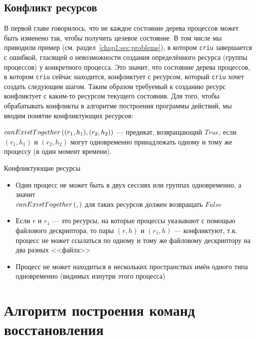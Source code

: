 \subsection{Конфликт ресурсов}
\label{chap2:subsec:conflict}

В первой главе говорилось, что не каждое состояние дерева процессов может быть изменено так, чтобы получить целевое 
состояние. В том числе мы приводили пример (см. раздел~\ref{chap1:sec:problems}), в котором \texttt{criu} завершается 
с ошибкой, гласящей о невозможности создания определённого ресурса (группы процессов) у конкретного процесса. Это 
значит, что состояние дерева процессов, в котором \texttt{criu} сейчас находится, конфликтует с ресурсом, который 
\texttt{criu} хочет создать следующим шагом. Таким образом требуемый к созданию ресурс конфликтует с каким-то ресурсом 
текущего состояния. Для того, чтобы обрабатывать конфликты в алгоритме построения программы действий, мы вводим понятие конфликтующих ресурсов:

\begin{defn}
\label{def:canexist}
$canExistTogether\left( (r_1, h_1), (r_2, h_2) \right)$ --- предикат, возвращающий $True$, если $(r_1, h_1)$ и $(r_2, h_2)$ могут одновременно принадлежать одному и тому же процессу (в один момент времени).
\end{defn}

\begin{exmp}{Конфликтующие ресурсы}
\begin{itemize}
	\item Один процесс не может быть в двух сессиях или группах одновременно, а значит \\ $canExistTogether\left( ,  \right)$ для таких ресурсов должен возвращать $False$
	\item Если $r$ и $r_1$ --- это ресурсы, на которые процессы указывают с помощью файлового дескриптора, то пары $(r, h)$ и $(r_1, h)$ --- конфликтуют, т.к. процесс не может ссылаться по одному и тому же файловому дескриптору на два разных <<файла>>
	\item Процесс не может находиться в нескольких пространствах имён одного типа одновременно (видимых изнутри этого процесса)
\end{itemize}
\end{exmp}


\section{Алгоритм построения команд восстановления}
\label{chap2:sec:actionsequence}

